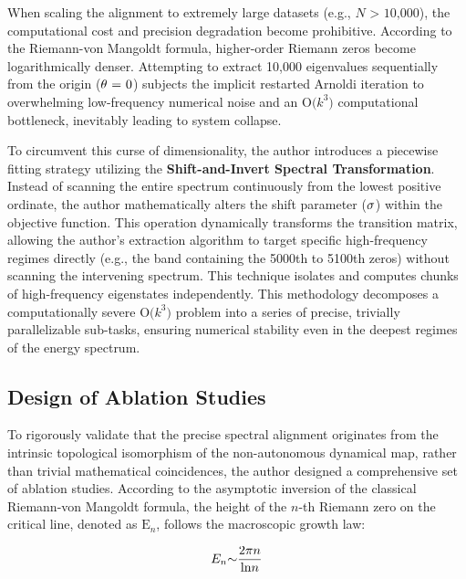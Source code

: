\documentclass[mca,article,submit,oneauthor,pdftex]{Definitions/mdpi}
\begin{document}
When scaling the alignment to extremely large datasets (e.g.,
\({N}\text{~>~10,000}\)), the computational cost and precision
degradation become prohibitive. According to the Riemann-von Mangoldt
formula, higher-order Riemann zeros become logarithmically denser.
Attempting to extract 10,000 eigenvalues sequentially from the origin
(\(\text{\ensuremath{\theta}}\text{~=~0}\)) subjects the implicit restarted Arnoldi
iteration to overwhelming low-frequency numerical noise and an
\(\text{O}\text{(}{k}^{\text{3}}\text{)}\) computational
bottleneck, inevitably leading to system collapse.

To circumvent this curse of dimensionality, the author introduces a piecewise
fitting strategy utilizing the \textbf{Shift-and-Invert Spectral
Transformation}. Instead of scanning the entire spectrum continuously
from the lowest positive ordinate, the author mathematically alters the shift parameter
(\(\text{\ensuremath{\sigma}}\)) within the objective function. This operation dynamically
transforms the transition matrix, allowing the author's extraction algorithm to
target specific high-frequency regimes directly
(e.g., the band containing the 5000th to 5100th zeros) without scanning
the intervening spectrum. This technique isolates and computes chunks of
high-frequency eigenstates independently. This methodology decomposes a computationally
severe \(\text{O}\text{(}{k}^{\text{3}}\text{)}\) problem
into a series of precise, trivially parallelizable sub-tasks,
ensuring numerical stability even in the deepest regimes of the energy
spectrum.

\subsection{Design of Ablation Studies}

To rigorously validate that the precise spectral alignment originates
from the intrinsic topological isomorphism of the non-autonomous
dynamical map, rather than trivial mathematical coincidences, the author
designed a comprehensive set of ablation studies. According to the
asymptotic inversion of the classical Riemann-von Mangoldt formula, the
height of the \({n}\)-th Riemann zero on the critical line, denoted
as \(\text{E}_{{n}}\), follows the macroscopic growth law:

\begin{equation}
{E}_{{n}}\text{\ensuremath{\sim}}\frac{\text{2}\text{\ensuremath{\pi}}n}{\text{ln}{n}}
\end{equation}
\end{document}
